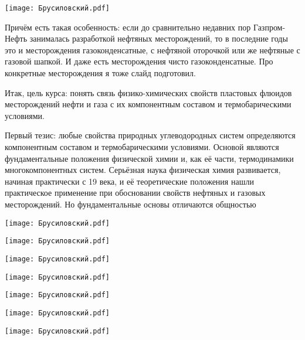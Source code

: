 \documentclass[main.tex]{subfiles}
\begin{document}
\begin{center}
\texttt{[image: Брусиловский.pdf]}
\end{center}

Причём есть такая особенность: если до сравнительно недавних пор Газпром-Нефть занималась разработкой нефтяных месторождений, то в последние годы это и месторождения газоконденсатные, с нефтяной оторочкой или же нефтяные с газовой шапкой.
И даже есть месторождения чисто газоконденсатные.
Про конкретные месторождения я тоже слайд подготовил.

Итак, цель курса: понять связь физико-химических свойств пластовых флюидов месторождений нефти и газа с их компонентным составом и термобарическими условиями.

Первый тезис: любые свойства природных углеводородных систем определяются компонентным составом и термобарическими условиями.
Основой являются фундаментальные положения физической химии и, как её части, термодинамики многокомпонентных систем.
Серьёзная наука физическая химия развивается, начиная практически с 19 века, и её теоретические положения нашли практическое применение при обосновании свойств нефтяных и газовых месторождений.
Но фундаментальные основы отличаются общностью

\begin{center}
\texttt{[image: Брусиловский.pdf]}
\end{center}

\begin{center}
\texttt{[image: Брусиловский.pdf]}
\end{center}

\begin{center}
\texttt{[image: Брусиловский.pdf]}
\end{center}

\begin{center}
\texttt{[image: Брусиловский.pdf]}
\end{center}

\begin{center}
\texttt{[image: Брусиловский.pdf]}
\end{center}

\begin{center}
\texttt{[image: Брусиловский.pdf]}
\end{center}

\begin{center}
\texttt{[image: Брусиловский.pdf]}
\end{center}
\end{document}
